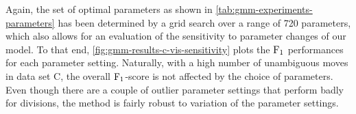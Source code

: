 Again, the set of optimal parameters as shown in \cref{tab:gmm-experiments-parameters} has been
determined by a grid search over a range of 720 parameters, which also allows for an evaluation of
the sensitivity to parameter changes of our model. To that end, \cref{fig:gmm-results-c-vis-sensitivity}
plots the $\operatorname{F}_{1}$ performances for each parameter setting. Naturally, with a high number of
unambiguous moves in data set C, the overall $\operatorname{F}_{1}$-score is not affected by the choice of
parameters. Even though there are a couple of outlier parameter settings that perform badly for
divisions, the method is fairly robust to variation of the parameter settings.
